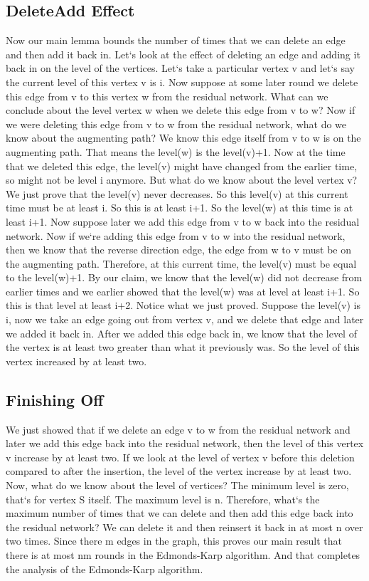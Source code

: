 \subsection{DeleteAdd Effect}
Now our main lemma bounds the number of times that we can delete an edge and then add it back in.
Let`s look at the effect of deleting an edge and adding it back in on the level of the vertices.
Let`s take a particular vertex v and let`s say the current level of this vertex v is i.
Now suppose at some later round we delete this edge from v to this vertex w from the residual network.
What can we conclude about the level vertex w when we delete this edge from v to w? Now if we were deleting this edge from v to w from the residual network, what do we know about the augmenting path? We know this edge itself from v to w is on the augmenting path.
That means the level(w) is the level(v)+1.
Now at the time that we deleted this edge, the level(v) might have changed from the earlier time, so might not be level i anymore.
But what do we know about the level vertex v? We just prove that the level(v) never decreases.
So this level(v) at this current time must be at least i.
So this is at least i+1.
So the level(w) at this time is at least i+1.
Now suppose later we add this edge from v to w back into the residual network.
Now if we`re adding this edge from v to w into the residual network, then we know that the reverse direction edge, the edge from w to v must be on the augmenting path.
Therefore, at this current time, the level(v) must be equal to the level(w)+1.
By our claim, we know that the level(w) did not decrease from earlier times and we earlier showed that the level(w) was at level at least i+1.
So this is that level at least i+2.
Notice what we just proved.
Suppose the level(v) is i, now we take an edge going out from vertex v, and we delete that edge and later we added it back in.
After we added this edge back in, we know that the level of the vertex is at least two greater than what it previously was.
So the level of this vertex increased by at least two.

\subsection{Finishing Off}
We just showed that if we delete an edge v to w from the residual network and later we add this edge back into the residual network, then the level of this vertex v increase by at least two.
If we look at the level of vertex v before this deletion compared to after the insertion, the level of the vertex increase by at least two.
Now, what do we know about the level of vertices? The minimum level is zero, that`s for vertex S itself.
The maximum level is n.
Therefore, what`s the maximum number of times that we can delete and then add this edge back into the residual network? We can delete it and then reinsert it back in at most n over two times.
Since there m edges in the graph, this proves our main result that there is at most nm rounds in the Edmonds-Karp algorithm.
And that completes the analysis of the Edmonds-Karp algorithm.

